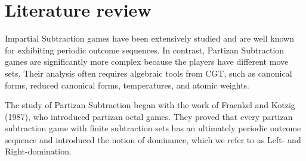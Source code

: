 \documentclass[oneside,reqno]{amsart}
\newcommand{\an}[1]{\textcolor{red}{#1}}
\begin{document}





\section{Literature review}\label{sec: literature review}

{\sc Impartial Subtraction} games have been extensively studied and are well known for exhibiting periodic outcome sequences. In contrast, {\sc Partizan Subtraction} games are significantly more complex because the players have different move sets. Their analysis often requires algebraic tools from CGT, such as canonical forms, reduced canonical forms, temperatures, and atomic weights.

The study of {\sc Partizan Subtraction} began with the work of Fraenkel and Kotzig \cite{FA} (1987), who introduced partizan octal games. They proved that every partizan subtraction game with finite subtraction sets has an ultimately periodic outcome sequence and introduced the notion of dominance, which we refer to as Left- and Right-domination.

\end{document}
